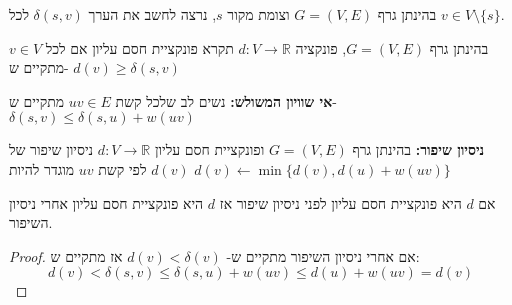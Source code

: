 בהינתן גרף 
$G = (V, E)$
וצומת מקור $s$,
נרצה לחשב את הערך 
$\delta(s,v)$
לכל 
$v \in V \setminus \{s\}$.

\begin{definition}
בהינתן גרף 
$G = (V, E)$,
פונקציה 
$d:V \to \mathbb{R}$
תקרא פונקציית חסם עליון אם לכל 
$v \in V$
מתקיים ש-%
$d(v) \geq \delta(s,v)$
\end{definition}

\textbf{אי שוויון המשולש:}
נשים לב שלכל קשת 
$uv \in E$
מתקיים ש-%
$\delta(s,v) \leq \delta(s,u) + w(uv)$

\textbf{ניסיון שיפור:}
בהינתן גרף 
$G = (V,E)$
ופונקציית חסם עליון 
$d:V \to \mathbb{R}$
ניסיון שיפור של
$d(v)$
לפי קשת $uv$ מוגדר להיות
$d(v) \leftarrow \min\{d(v), d(u) + w(uv)\}$

\begin{claim}
אם $d$ היא פונקציית חסם עליון לפני ניסיון שיפור אז $d$ היא פונקציית חסם עליון אחרי ניסיון השיפור.
\end{claim}
\begin{proof}
אם אחרי ניסיון השיפור מתקיים ש-%
$d(v) < \delta(v)$
אז מתקיים ש:%
$$d(v) < \delta(s,v) \leq \delta(s,u) + w(uv) \leq d(u) + w(uv) = d(v)$$

\end{proof}

